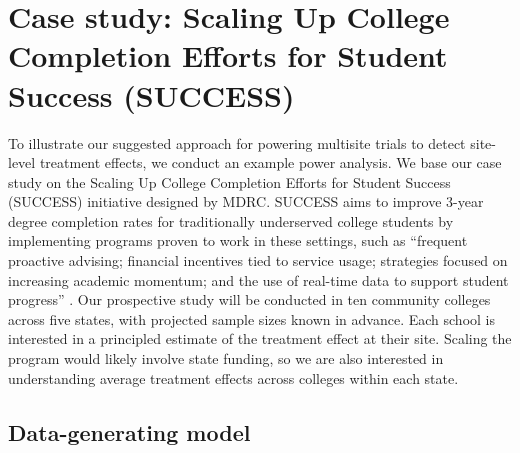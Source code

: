 \documentclass[]{article}
\begin{document}

\section{Case study: Scaling Up College Completion Efforts for Student Success (SUCCESS)}

To illustrate our suggested approach for powering multisite trials to detect site-level treatment effects, we conduct an example power analysis.
We base our case study on the Scaling Up College Completion Efforts for Student Success (SUCCESS) initiative designed by MDRC.
SUCCESS aims to improve 3-year degree completion rates for traditionally underserved college students by implementing programs proven to work in these settings, such as ``frequent proactive advising; financial incentives tied to service usage; strategies focused on increasing academic momentum; and the use of real-time data to support student progress'' \citep{MDRCsuccess}.
Our prospective study will be conducted in ten community colleges across five states, with projected sample sizes known in advance.
Each school is interested in a principled estimate of the treatment effect at their site.
Scaling the program would likely involve state funding, so we are also interested in understanding average treatment effects across colleges within each state.

\subsection{Data-generating model}
\end{document}
